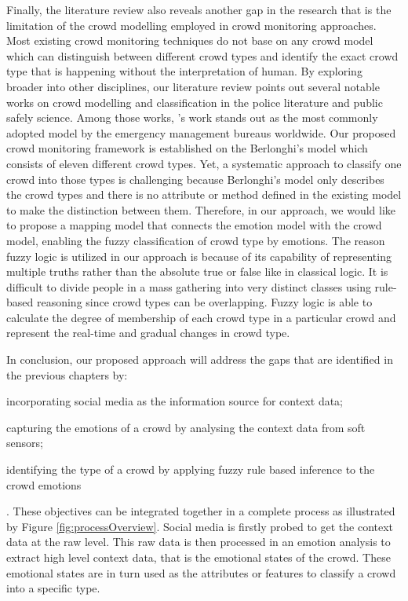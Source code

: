 Finally, the literature review also reveals another gap in the research that is the limitation of the crowd modelling employed in crowd monitoring approaches. Most existing crowd monitoring techniques do not base on any crowd model which can distinguish between different crowd types and identify the exact crowd type that is happening without the interpretation of human. By exploring broader into other disciplines, our literature review points out several notable works on crowd modelling and classification in the police literature and public safely science. Among those works, \citet{Berlonghi1995}'s work stands out as the most commonly adopted model by the emergency management bureaus worldwide. Our proposed crowd monitoring framework is established on the Berlonghi's model which consists of eleven different crowd types. Yet, a systematic approach to classify one crowd into those types is challenging because Berlonghi's model only describes the crowd types and there is no attribute or method defined in the existing model to make the distinction between them. Therefore, in our approach, we would like to propose a mapping model that connects the emotion model with the crowd model, enabling the fuzzy classification of crowd type by emotions. The reason fuzzy logic is utilized in our approach is because of its capability of representing multiple truths rather than the absolute true or false like in classical logic. It is difficult to divide people in a mass gathering into very distinct classes using rule-based reasoning since crowd types can be overlapping. Fuzzy logic is able to calculate the degree of membership of each crowd type in a particular crowd and represent the real-time and gradual changes in crowd type.

In conclusion, our proposed approach will address the gaps that are identified in the previous chapters by: 
\begin{inparaenum}[i)]
\item incorporating social media as the information source for context data;
\item capturing the emotions of a crowd by analysing the context data from soft sensors;
\item identifying the type of a crowd by applying fuzzy rule based inference to the crowd emotions
\end{inparaenum}. These objectives can be integrated together in a complete process as illustrated by Figure \ref{fig:processOverview}. Social media is firstly probed to get the context data at the raw level. This raw data is then processed in an emotion analysis to extract high level context data, that is the emotional states of the crowd. These emotional states are in turn used as the attributes or features to classify a crowd into a specific type.

